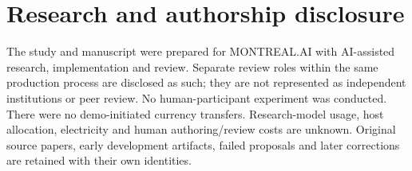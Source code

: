 \documentclass[11pt]{article}
\begin{document}
\section{Research and authorship disclosure}

The study and manuscript were prepared for MONTREAL.AI with AI-assisted research, implementation and review. Separate review roles within the same production process are disclosed as such; they are not represented as independent institutions or peer review. No human-participant experiment was conducted. There were no demo-initiated currency transfers. Research-model usage, host allocation, electricity and human authoring/review costs are unknown. Original source papers, early development artifacts, failed proposals and later corrections are retained with their own identities.

\end{document}
